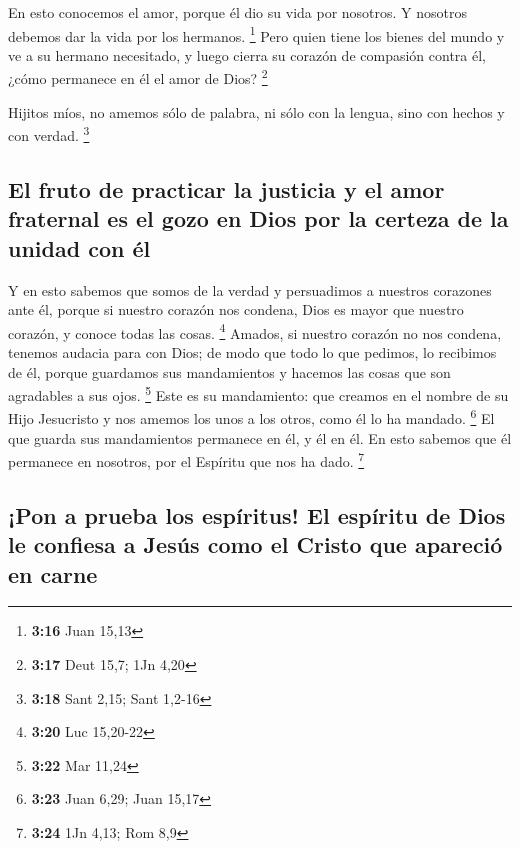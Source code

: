 En esto conocemos el amor, porque él dio su vida por
nosotros. Y nosotros debemos dar la vida por los hermanos. \footnote{\textbf{3:16}
  Juan 15,13}  Pero quien tiene los bienes del mundo y ve
a su hermano necesitado, y luego cierra su corazón de compasión contra
él, ¿cómo permanece en él el amor de Dios? \footnote{\textbf{3:17} Deut
  15,7; 1Jn 4,20}

 Hijitos míos, no amemos sólo de palabra, ni sólo con la
lengua, sino con hechos y con verdad. \footnote{\textbf{3:18} Sant 2,15;
  Sant 1,2-16}

\hypertarget{el-fruto-de-practicar-la-justicia-y-el-amor-fraternal-es-el-gozo-en-dios-por-la-certeza-de-la-unidad-con-uxe9l}{%
\subsection{El fruto de practicar la justicia y el amor fraternal es el
gozo en Dios por la certeza de la unidad con
él}\label{el-fruto-de-practicar-la-justicia-y-el-amor-fraternal-es-el-gozo-en-dios-por-la-certeza-de-la-unidad-con-uxe9l}}

 Y en esto sabemos que somos de la verdad y persuadimos a
nuestros corazones ante él,  porque si nuestro corazón
nos condena, Dios es mayor que nuestro corazón, y conoce todas las
cosas. \footnote{\textbf{3:20} Luc 15,20-22}  Amados, si
nuestro corazón no nos condena, tenemos audacia para con Dios;
 de modo que todo lo que pedimos, lo recibimos de él,
porque guardamos sus mandamientos y hacemos las cosas que son agradables
a sus ojos. \footnote{\textbf{3:22} Mar 11,24}  Este es
su mandamiento: que creamos en el nombre de su Hijo Jesucristo y nos
amemos los unos a los otros, como él lo ha mandado. \footnote{\textbf{3:23}
  Juan 6,29; Juan 15,17}  El que guarda sus mandamientos
permanece en él, y él en él. En esto sabemos que él permanece en
nosotros, por el Espíritu que nos ha dado. \footnote{\textbf{3:24} 1Jn
  4,13; Rom 8,9}

\hypertarget{pon-a-prueba-los-espuxedritus-el-espuxedritu-de-dios-le-confiesa-a-jesuxfas-como-el-cristo-que-apareciuxf3-en-carne}{%
\subsection{¡Pon a prueba los espíritus! El espíritu de Dios le confiesa
a Jesús como el Cristo que apareció en
carne}\label{pon-a-prueba-los-espuxedritus-el-espuxedritu-de-dios-le-confiesa-a-jesuxfas-como-el-cristo-que-apareciuxf3-en-carne}}

